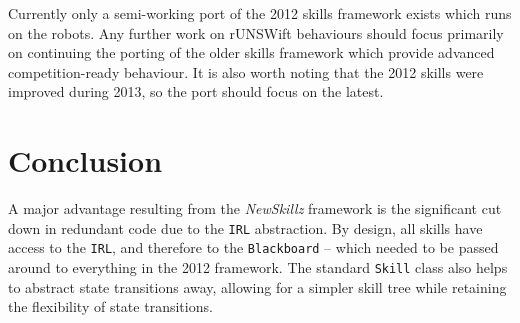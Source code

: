 Currently only a semi-working port of the 2012 skills framework exists which runs on the robots. Any further work on rUNSWift behaviours should focus primarily on continuing the porting of the older skills framework which provide advanced competition-ready behaviour. It is also worth noting that the 2012 skills were improved during 2013, so the port should focus on the latest.

\section{Conclusion}

A major advantage resulting from the \textit{NewSkillz} framework is the significant cut down in redundant code due to the \texttt{IRL} abstraction. By design, all skills have access to the \texttt{IRL}, and therefore to the \texttt{Blackboard} -- which needed to be passed around to everything in the 2012 framework. The standard \texttt{Skill} class also helps to abstract state transitions away, allowing for a simpler skill tree while retaining the flexibility of state transitions.
